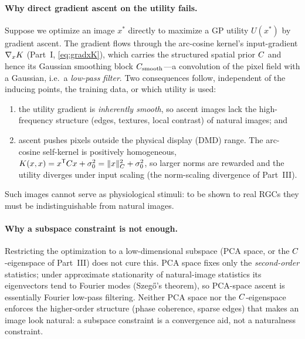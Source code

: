 \paragraph{Why direct gradient ascent on the utility fails.}
Suppose we optimize an image $x^{*}$ directly to maximize a GP utility $U(x^{*})$
by gradient ascent. The gradient flows through the arc-cosine kernel's
input-gradient $\nabla_{x}K$ (Part~I, \eqref{eq:gradxK}), which carries the
structured spatial prior $C$ and hence its Gaussian smoothing block
$C_{\mathrm{smooth}}$---a convolution of the pixel field with a Gaussian, i.e.\ a \emph{low-pass
filter}. Two consequences follow, independent of the inducing points, the
training data, or which utility is used:
\begin{enumerate}[leftmargin=1.4em,itemsep=1pt,topsep=2pt]
  \item the utility gradient is \emph{inherently smooth}, so ascent images lack
        the high-frequency structure (edges, textures, local contrast) of natural
        images; and
  \item ascent pushes pixels outside the physical display (DMD) range. The
        arc-cosine self-kernel is positively homogeneous, $K(x,x)=x^{\mathsf{T}}
        C x+\sigma_{0}^{2}=\lVert x\rVert_{C}^{2}+\sigma_{0}^{2}$, so larger norms
        are rewarded and the utility diverges under input scaling (the
        norm-scaling divergence of Part~III).
\end{enumerate}
Such images cannot serve as physiological stimuli: to be shown to real RGCs they
must be indistinguishable from natural images.

\paragraph{Why a subspace constraint is not enough.}
Restricting the optimization to a low-dimensional subspace (PCA space, or the
$C$-eigenspace of Part~III) does not cure this. PCA space fixes only the
\emph{second-order} statistics; under approximate stationarity of natural-image
statistics its eigenvectors tend to Fourier modes (Szeg\H{o}'s theorem), so
PCA-space ascent is essentially Fourier low-pass filtering. Neither PCA space nor
the $C$-eigenspace enforces the higher-order structure (phase coherence,
sparse edges) that makes an image look natural: a subspace constraint is a
convergence aid, not a naturalness constraint.

